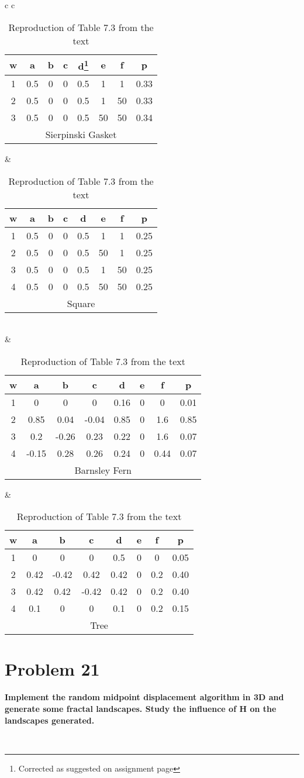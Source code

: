\begin{table}
\begin{tabular}{ c c }
	\begin{tabular}{ c c c c c c c c }
	\hline
	w & a & b & c & d\footnote{Corrected as suggested on assignment page} & e & f & p \\
	\hline
	1 & 0.5 & 0 & 0 & 0.5 & 1 & 1 & 0.33 \\
	2 & 0.5 & 0 & 0 & 0.5 & 1 & 50 & 0.33 \\
	3 & 0.5 & 0 & 0 & 0.5 & 50 & 50 & 0.34 \\
	\hline
	\multicolumn{8}{c}{Sierpinski Gasket}
	\end{tabular} &

	\begin{tabular}{ c c c c c c c c }
	\hline
	w & a & b & c & d & e & f & p \\
	\hline
	1 & 0.5 & 0 & 0 & 0.5 & 1 & 1 & 0.25 \\
	2 & 0.5 & 0 & 0 & 0.5 & 50 & 1 & 0.25 \\
	3 & 0.5 & 0 & 0 & 0.5 & 1 & 50 & 0.25 \\
	4 & 0.5 & 0 & 0 & 0.5 & 50 & 50 & 0.25 \\
	\hline
	\multicolumn{8}{c}{Square}
	\end{tabular} \\
	
	\hfill & \hfill \\
	
	\begin{tabular}{ c c c c c c c c }
	\hline
	w & a & b & c & d & e & f & p \\
	\hline
	1 & 0 & 0 & 0 & 0.16 & 0 & 0 & 0.01 \\
	2 & 0.85 & 0.04 & -0.04 & 0.85 & 0 & 1.6 &0.85 \\
	3 & 0.2 & -0.26 & 0.23 & 0.22 & 0 & 1.6 & 0.07 \\
	4 & -0.15 & 0.28 & 0.26 & 0.24 & 0 & 0.44 & 0.07 \\
	\hline
	\multicolumn{8}{c}{Barnsley Fern}
	\end{tabular} &
	
	\begin{tabular}{ c c c c c c c c }
	\hline
	w & a & b & c & d & e & f & p \\
	\hline
	1 & 0 & 0 & 0 & 0.5 & 0 & 0 & 0.05 \\
	2 & 0.42 & -0.42 & 0.42 & 0.42 & 0 & 0.2 & 0.40 \\
	3 & 0.42 & 0.42 & -0.42 & 0.42 & 0 & 0.2 & 0.40 \\
	4 & 0.1 & 0 & 0 & 0.1 & 0 & 0.2 & 0.15 \\
	\hline
	\multicolumn{8}{c}{Tree}
	\end{tabular}
\end{tabular}
\caption{Reproduction of Table 7.3 from the text}
\label{7.3_rep}
\end{table}

\section{Problem 21}
\textbf{
Implement the random midpoint displacement algorithm in 3D and generate some fractal landscapes. Study the influence of H on the landscapes generated.
}

\hfill \\
